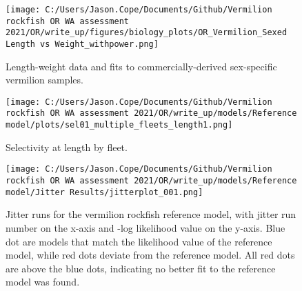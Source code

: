 \documentclass[11pt,
  english,
  a4paper,
]{article}
\begin{document}
\tagmcend\tagstructend


\begin{figure}
\centering
\texttt{[image: C:/Users/Jason.Cope/Documents/Github/Vermilion rockfish OR WA assessment 2021/OR/write\_up/figures/biology\_plots/OR\_Vermilion\_Sexed Length vs Weight\_withpower.png]}
\caption{Length-weight data and fits to commercially-derived sex-specific vermilion samples.\label{fig:len-weight-fit}}
\end{figure}

\tagmcend\tagstructend


\begin{figure}
\centering
\texttt{[image: C:/Users/Jason.Cope/Documents/Github/Vermilion rockfish OR WA assessment 2021/OR/write\_up/models/Reference model/plots/sel01\_multiple\_fleets\_length1.png]}
\caption{Selectivity at length by fleet.\label{fig:selex}}
\end{figure}

\tagmcend\tagstructend


\begin{figure}
\centering
\texttt{[image: C:/Users/Jason.Cope/Documents/Github/Vermilion rockfish OR WA assessment 2021/OR/write\_up/models/Reference model/Jitter Results/jitterplot\_001.png]}
\caption{Jitter runs for the vermilion rockfish reference model, with jitter run number on the x-axis and -log likelihood value on the y-axis. Blue dot are models that match the likelihood value of the reference model, while red dots deviate from the reference model. All red dots are above the blue dots, indicating no better fit to the reference model was found.\label{fig:jitter_001}}
\end{figure}
\end{document}
